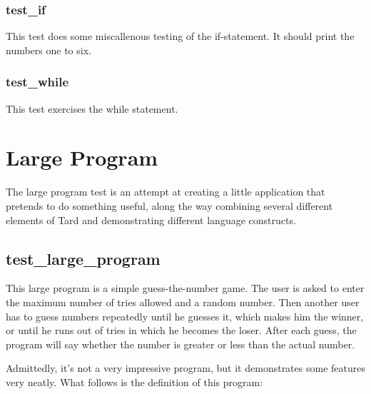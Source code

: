 \documentclass{report}
\begin{document}
\subsubsection*{test\_if}

This test does some miscallenous testing of the if-statement. It
should print the numbers one to six.

\subsubsection*{test\_while}

This test exercises the while statement.

\section{Large Program}

The large program test is an attempt at creating a little
application that pretends to do something useful, along the way
combining several different elements of Tard and demonstrating
different language constructs.

\subsection{test\_large\_program}

This large program is a simple guess-the-number game. The user is
asked to enter the maximum number of tries allowed and a random
number. Then another user has to guess numbers repeatedly until he
guesses it, which makes him the winner, or until he runs out of
tries in which he becomes the loser. After each guess, the program
will say whether the number is greater or less than the actual
number.

Admittedly, it's not a very impressive program, but it demonstrates
some features very neatly. What follows is the definition of this
program:
\end{document}
